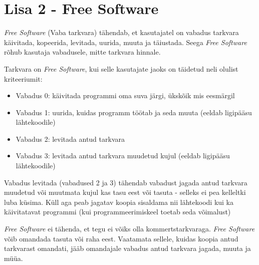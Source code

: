 \documentclass[a4paper,12pt]{article} %
\begin{document}
\section*{Lisa 2 - Free Software}
\label{lisa_free_software}
\textit{Free Software} (Vaba tarkvara) tähendab, et kasutajatel on vabadus tarkvara käivitada, kopeerida, levitada, uurida, muuta ja täiustada. Seega \textit{Free Software} rõhub kasutaja vabadusele, mitte tarkvara hinnale. \par
Tarkvara on \textit{Free Software}, kui selle kasutajate jaoks on täidetud neli olulist kriteeriumit:
\begin{itemize}
\item Vabadus 0: käivitada programmi oma suva järgi, ükskõik mis eesmärgil
\item Vabadus 1: uurida, kuidas programm töötab ja seda muuta (eeldab ligipääsu lähtekoodile)
\item Vabadus 2: levitada antud tarkvara
\item Vabadus 3: levitada antud tarkvara muudetud kujul (eeldab ligipääsu lähtekoodile)
\end{itemize}
Vabadus levitada (vabadused 2 ja 3) tähendab vabadust jagada antud tarkvara muudetud või muutmata kujul kas tasu eest või tasuta - selleks ei pea kelleltki luba küsima. Küll aga peab jagatav koopia sisaldama nii lähtekoodi kui ka käivitatavat programmi (kui programmeerimiskeel toetab seda võimalust)\par
\textit{Free Software} ei tähenda, et tegu ei võiks olla kommertstarkvaraga. \textit{Free Software} võib omandada tasuta või raha eest. Vaatamata sellele, kuidas koopia antud tarkvarast omandati,  jääb omandajale vabadus antud tarkvara jagada, muuta ja müüa.
\cite{GNU_Free_SW}
\end{document}
